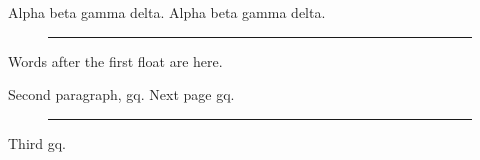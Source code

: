 \documentclass{article}
\begin{document}
Alpha beta gamma delta. Alpha beta gamma delta.
\begin{figure}[b]
\rule{4cm}{1cm}
\end{figure}
Words after the first float are here.

Second paragraph, gq.
\newpage
Next page gq.
\begin{figure}[t]
\rule{4cm}{1cm}
\end{figure}
\newpage
Third gq.
\end{document}
